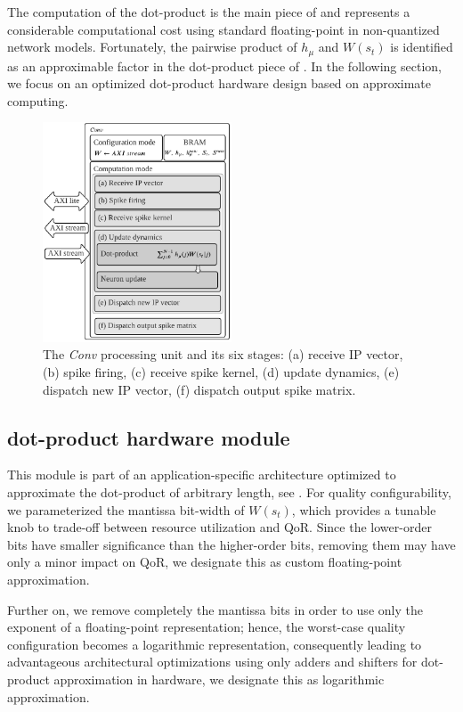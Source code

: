 The computation of the dot-product is the main piece of  and represents a considerable computational cost using standard floating-point in non-quantized network models. Fortunately, the pairwise product of $h_{\mu}$ and $W(s_t)$ is identified as an approximable factor in the dot-product piece of . In the following section, we focus on an optimized dot-product hardware design based on approximate computing.


\begin{figure}
	\centering
	\includegraphics[width=0.5\textwidth]{../figures/sbs_conv.pdf}
	\caption{The \emph{Conv} processing unit and its six stages: (a) receive IP vector, (b) spike firing, (c) receive spike kernel, (d) update dynamics, (e) dispatch new IP vector, (f) dispatch output spike matrix.}
	\label{fig:hw_conv}
\end{figure}

\subsection{dot-product hardware module}
This module is part of an application-specific architecture optimized to approximate the dot-product of arbitrary length, see . For quality configurability, we parameterized the mantissa bit-width of $W(s_t)$, which provides a tunable knob to trade-off between resource utilization and QoR. Since the lower-order bits have smaller significance than the higher-order bits, removing them may have only a minor impact on QoR, we designate this as custom floating-point approximation.

Further on, we remove completely the mantissa bits in order to use only the exponent of a floating-point representation; hence, the worst-case quality configuration becomes a logarithmic representation, consequently leading to advantageous architectural optimizations using only adders and shifters for dot-product approximation in hardware, we designate this as logarithmic approximation.

